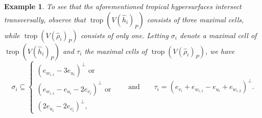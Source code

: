 \documentclass[12pt,reqno,a4paper]{amsart}
\theoremstyle{theoremstyle}
\theoremstyle{examplestyle}
\newtheorem{example}[theorem]{Example}
\theoremstyle{algorithmstyle}
\DeclareMathOperator{\trop}{trop}
\begin{document}
\begin{example}
  To see that the aforementioned tropical hypersurfaces intersect transversally, observe that $\trop(V(\hat h_i)_P)$ consists of three maximal cells, while $\trop(V(\hat \rho_i)_P)$ consists of only one. Letting $\sigma_i$ denote a maximal cell of $\trop(V(\hat h_i)_P)$ and $\tau_i$ %
  the maximal cells of $\trop(V(\hat \rho_i)_P)$, we have
  \begin{equation*}
    \sigma_i\subseteq
    \begin{cases}
      (e_{w_{i,1}}-3e_{u_i})^\perp \text{ or}\\
      (e_{w_{i,1}}-e_{u_i}-2e_{v_i})^\perp \text{ or}\\
      (2e_{u_i}-2e_{v_i})^\perp,
    \end{cases}
    \qquad\text{and}\qquad \tau_i=(e_{v_i}+e_{w_{i,1}}-e_{u_i}+e_{w_{i,2}})^\perp.
  \end{equation*}


\end{example}
\end{document}
